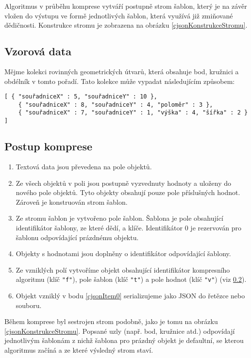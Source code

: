 Algoritmus v průběhu komprese vytváří postupně strom šablon, který je na závěr vložen do výstupu ve formě jednotlivých šablon, která využívá již zmiňované dědičnosti. Konstrukce stromu je zobrazena na obrázku \ref{cjsonKonstrukceStromu}.

\subsection{Vzorová data}
Mějme kolekci rovinných geometrických útvarů, která obsahuje bod, kružnici a obdélník v tomto pořadí. Tato kolekce může vypadat následujícím způsobem:

\begin{verbatim}
[ { "souřadniceX" : 5, "souřadniceY" : 10 },
    { "souřadniceX" : 8, "souřadniceY" : 4, "poloměr" : 3 },
    { "souřadniceX" : 7, "souřadniceY" : 1, "výška" : 4, "šířka" : 2 } ]
\end{verbatim}

\subsection{Postup komprese}
\label{cjsonPoKompresi}
\begin{enumerate}
\item Textová data jsou převedena na pole objektů.
\item Ze všech objektů v poli jsou postupně vyzvednuty hodnoty a uloženy do nového pole objektů. Tyto objekty obsahují pouze pole příslušných hodnot. Zároveň je konstruován strom šablon.
\item Ze stromu šablon je vytvořeno pole šablon. Šablona je pole obsahující identifikátor šablony, ze které dědí, a klíče. Identifikátor 0 je rezervován pro šablonu odpovídající prázdnému objektu.
\item Objekty s hodnotami jsou doplněny o identifikátor odpovídající šablony.
\item \label{cjsonItem0}Ze vzniklých polí vytvoříme objekt obsahující identifikátor kompresního algoritmu (klíč \texttt{"f"}), pole šablon (klíč \texttt{"t"}) a pole hodnot (klíč \texttt{"v"}) (viz \ref{cjsonPoKompresi}).
\item Objekt vzniklý v bodu \ref{cjsonItem0} serializujeme jako JSON do řetězce nebo souboru.
\end{enumerate}

Během komprese byl sestrojen strom podobně, jako je tomu na obrázku \ref{cjsonKonstrukceStromu}. Popsané uzly (např. bod, kružnice atd.) odpovídají jednotlivým šablonám z nichž šablona pro prázdný objekt je defaultní, se kterou algoritmus začíná a ze které výsledný strom staví.

